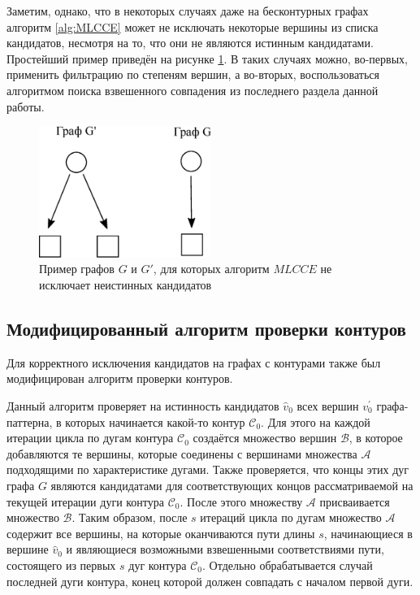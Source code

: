 Заметим, однако, что в некоторых случаях даже на бесконтурных графах алгоритм \ref{alg:MLCCE} может не исключать некоторые вершины из списка кандидатов, несмотря на то, что они не являются истинным кандидатами. Простейший пример приведён на рисунке \ref{fig:fail}. В таких случаях можно, во-первых, применить фильтрацию по степеням вершин, а во-вторых, воспользоваться алгоритмом поиска взвешенного совпадения из последнего раздела данной работы.

\begin{figure}[H]
	\centering
	\includegraphics[width=0.5\textwidth]{failgraphs}
	\caption{Пример графов $G$ и $G'$, для которых алгоритм $MLCCE$ не исключает неистинных кандидатов}
	\label{fig:fail}
\end{figure}

\subsection{Модифицированный алгоритм проверки контуров}

Для корректного исключения кандидатов на графах с контурами также был модифицирован алгоритм проверки контуров. 

Данный алгоритм проверяет на истинность кандидатов $\widehat{v}_0$ всех вершин $v_0^{\prime}$ графа-паттерна, в которых начинается какой-то контур $\mathcal{C}_0$. Для этого на каждой итерации цикла по дугам контура $\mathcal{C}_0$ создаётся множество вершин $\mathcal{B}$, в которое добавляются те вершины, которые соединены с вершинами множества $\mathcal{A}$ подходящими по характеристике дугами. Также проверяется, что концы этих дуг графа $G$ являются кандидатами для соответствующих концов рассматриваемой на текущей итерации дуги контура $\mathcal{C}_0$. После этого множеству $\mathcal{A}$ присваивается множество $\mathcal{B}$. Таким образом, после $s$ итераций цикла по дугам множество $\mathcal{A}$ содержит все вершины, на которые оканчиваются пути длины $s$, начинающиеся в вершине $\widehat{v}_0$ и являющиеся возможными взвешенными соответствиями пути, состоящего из первых $s$ дуг контура $\mathcal{C}_0$. Отдельно обрабатывается случай последней дуги контура, конец которой должен совпадать с началом первой дуги.

